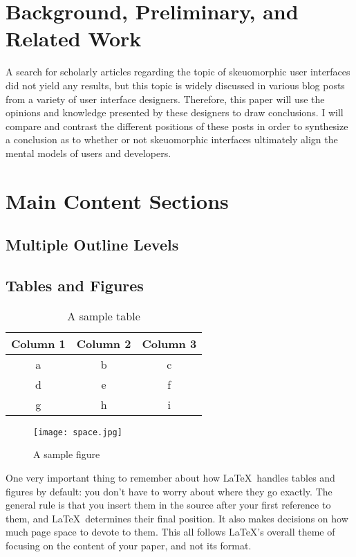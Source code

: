 \documentclass{article}
\begin{document}
\section{Background, Preliminary, and Related Work}

A search for scholarly articles regarding the topic of skeuomorphic user interfaces did not yield any results, but this topic is widely discussed in various blog posts from a variety of user interface designers. Therefore, this paper will use the opinions and knowledge presented by these designers to draw conclusions. I will compare and contrast the different positions of these posts in order to synthesize a conclusion as to whether or not skeuomorphic interfaces ultimately align the mental models of users and developers.

\section{Main Content Sections}



\subsection{Multiple Outline Levels}

\subsection{Tables and Figures}

\begin{table}
\centering
\begin{tabular}{|c|c|c|}\hline
Column 1 & Column 2 & Column 3 \\\hline\hline
a & b & c \\
d & e & f \\
g & h & i \\\hline
\end{tabular}

\caption{A sample table}
\label{table-sample}
\end{table}

\begin{figure}
\centering
\texttt{[image: space.jpg]} 

\caption{A sample figure}
\label{figure-sample}
\end{figure}

One very important thing to remember about how \LaTeX\ handles tables and figures by default: you don't have to worry about where they go exactly.  The general rule is that you insert them in the source after your first reference to them, and \LaTeX\ determines their final position.  It also makes decisions on how much page space to devote to them.  This all follows \LaTeX's overall theme of focusing on the content of your paper, and not its format.
\end{document}
